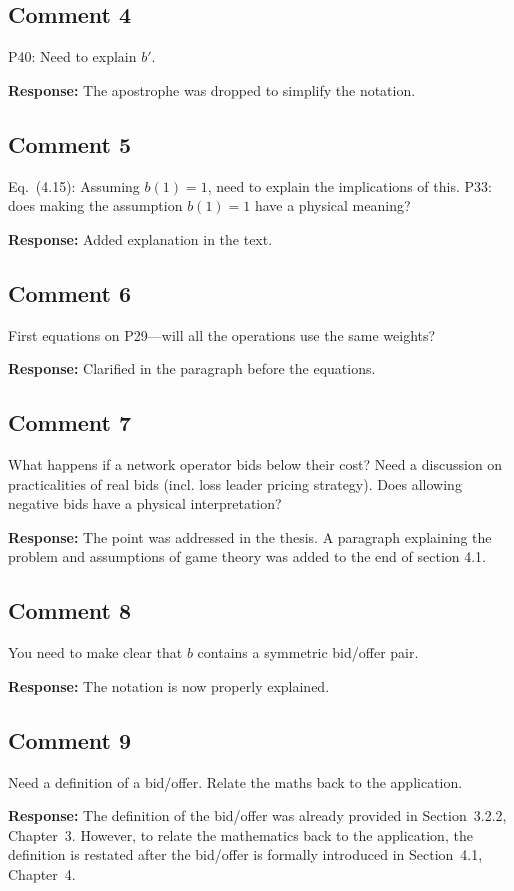 \documentclass[10pt,a4paper,notitlepage]{article}
\numberwithin{equation}{section}
\begin{document}
\subsection{Comment 4}
P40: Need to explain $b'$.

\textbf{Response:}
The apostrophe was dropped to simplify the notation.

\subsection{Comment 5}
Eq.~(4.15): Assuming $b(1) = 1$, need to explain the implications of this. P33: does making the assumption $b(1)=1$ have a physical meaning?

\textbf{Response:}
Added explanation in the text.

\subsection{Comment 6}
First equations on P29---will all the operations use the same weights?

\textbf{Response:}
Clarified in the paragraph before the equations.

\subsection{Comment 7}
What happens if a network operator bids below their cost? Need a discussion on practicalities of real bids (incl. loss leader pricing strategy). Does allowing negative bids have a physical interpretation?

\textbf{Response:}
The point was addressed in the thesis. A paragraph explaining the problem and assumptions of game theory was added to the end of section 4.1.

\subsection{Comment 8}
You need to make clear that $b$ contains a symmetric bid/offer pair.

\textbf{Response:}
The notation is now properly explained.

\subsection{Comment 9}
Need a definition of a bid/offer. Relate the maths back to the application.

\textbf{Response:}
The definition of the bid/offer was already provided in Section~3.2.2, Chapter~3. However, to relate the mathematics back to the application, the definition is restated after the bid/offer is formally introduced in Section~4.1, Chapter~4.
\end{document}
